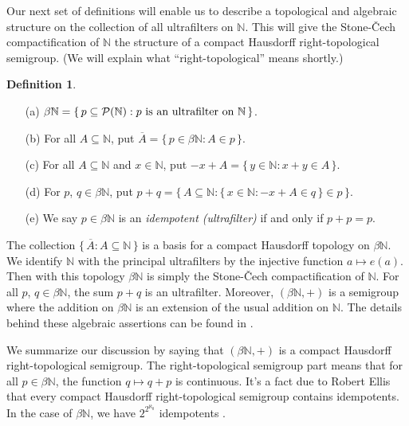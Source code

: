 \documentclass[12pt]{article}
\theoremstyle{plain}
\theoremstyle{definition}
\newtheorem{defn}[thm]{Definition}
\newcommand{\bbN}{\mathbb{N}}
\begin{document}
Our next set of definitions will enable us to describe a topological
and algebraic structure on the collection of all ultrafilters on $\bbN$.
This will give the Stone-\v{C}ech compactification of $\bbN$ the
structure of a compact Hausdorff right-topological semigroup. 
(We will explain what ``right-topological'' means shortly.)
\begin{defn}
  \label{defn:alg}
  \begin{itemize}
    \item[(a)] $\beta\bbN = \{\, p \subseteq \mathcal{P}(\bbN) :
      \hbox{$p$ is an ultrafilter on
      $\bbN$} \,\}$.
    \item[(b)] For all $A \subseteq \bbN$, put $\overline{A} = \{\,
      p \in \beta\bbN : A \in p \,\}$.
    \item[(c)] For all $A \subseteq \bbN$ and $x \in \bbN$, put
      $-x+A = \{\, y \in \bbN : x+y \in A \,\}$.
    \item[(d)] For $p$, $q \in \beta\bbN$, put
      $p+q = \bigl\{\, A \subseteq \bbN : \{\, x \in \bbN : -x +A \in q
      \,\} \in p \,\bigr\}$.
    \item[(e)] We say $p \in \beta\bbN$ is an \textsl{idempotent
        (ultrafilter)} if  and only if $p + p = p$.
  \end{itemize}
\end{defn}

The collection $\{\, \overline{A} : A \subseteq \bbN \,\}$ is a
basis for a compact Hausdorff topology on $\beta\bbN$.
We identify $\bbN$ with the principal ultrafilters by the injective
function $a \mapsto e(a)$. 
Then with this topology $\beta\bbN$ is simply the Stone-\v{C}ech
compactification of $\bbN$. 
For all $p$, $q \in \beta\bbN$, the sum $p+q$ is an ultrafilter.
Moreover, $(\beta\bbN, +)$ is a semigroup where the addition on
$\beta\bbN$ is an extension of the usual addition on $\bbN$. 
The details behind these algebraic assertions can be found in
\cite[Chapter 4 Section 1]{Hindman:1998fk}.

We summarize our discussion by saying that $(\beta\bbN,
+)$ is a compact Hausdorff right-topological semigroup. 
The right-topological semigroup part means that for all $p \in
\beta\bbN$, the function $q \mapsto q+p$ is continuous.
It's a fact due to Robert Ellis \cite[Corollary 2.10]{Ellis:1969zr}
that every compact Hausdorff right-topological semigroup contains
idempotents. 
In the case of $\beta\bbN$, we have 
$2^{2^{\aleph_0}}$ idempotents \cite[Theorem 6.44]{Hindman:1998fk}. 
\end{document}
